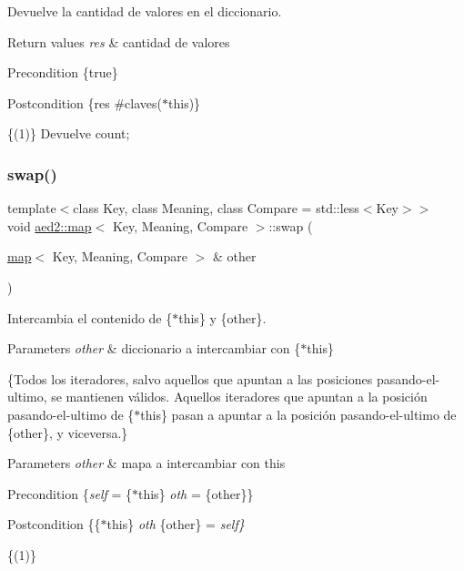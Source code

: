 Devuelve la cantidad de valores en el diccionario. 


\begin{DoxyRetVals}{Return values}
{\em res} & cantidad de valores\\
\hline
\end{DoxyRetVals}
\begin{DoxyPrecond}{Precondition}
\{true\} 
\end{DoxyPrecond}
\begin{DoxyPostcond}{Postcondition}
\{res  \#claves($\ast$this)\}
\end{DoxyPostcond}
\{(1)\} Devuelve count; \mbox{\label{classaed2_1_1map_a43ddb71cc91e5c6021a7a1f243d6cc4a}} 
\subsubsection{\texorpdfstring{swap()}{swap()}}
{\footnotesize\ttfamily template$<$class Key, class Meaning, class Compare = std\+::less$<$\+Key$>$$>$ \\
void \hyperlink{classaed2_1_1map}{aed2\+::map}$<$ Key, Meaning, Compare $>$\+::swap (\begin{DoxyParamCaption}\item[{\hyperlink{classaed2_1_1map}{map}$<$ Key, Meaning, Compare $>$ \&}]{other }\end{DoxyParamCaption})\hspace{0.3cm}{\ttfamily [inline]}}



Intercambia el contenido de \{$\ast$this\} y \{other\}. 


\begin{DoxyParams}{Parameters}
{\em other} & diccionario a intercambiar con \{$\ast$this\}\\
\hline
\end{DoxyParams}
\{Todos los iteradores, salvo aquellos que apuntan a las posiciones pasando-\/el-\/ultimo, se mantienen válidos. Aquellos iteradores que apuntan a la posición pasando-\/el-\/ultimo de \{$\ast$this\} pasan a apuntar a la posición pasando-\/el-\/ultimo de \{other\}, y viceversa.\}


\begin{DoxyParams}{Parameters}
{\em other} & mapa a intercambiar con this\\
\hline
\end{DoxyParams}
\begin{DoxyPrecond}{Precondition}
\{{\itshape self} = \{$\ast$this\}  {\itshape oth} = \{other\}\} 
\end{DoxyPrecond}
\begin{DoxyPostcond}{Postcondition}
\{\{$\ast$this\}  {\itshape oth}  \{other\} = {\itshape self\}} 
\end{DoxyPostcond}
\{(1)\}

